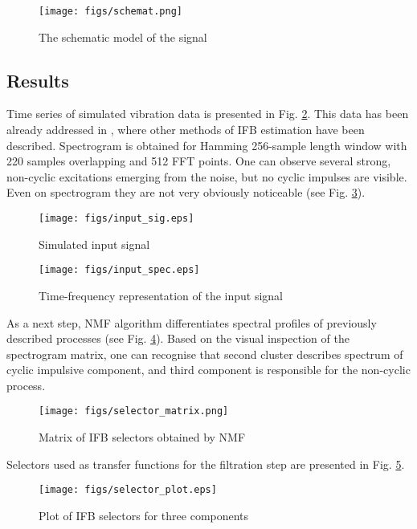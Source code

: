 \documentclass[conference,a4paper]{IEEEtran}
\begin{document}
\begin{figure}[ht!]
    \centering
    \texttt{[image: figs/schemat.png]}
    \caption{The schematic model of the signal}
    \label{fig:schemat sygnal}
\end{figure}

\subsection{Results}

Time series of simulated vibration data is presented in Fig. \ref{fig: input}. This data has been already addressed in \cite{wylomanskaimpulsive}, where other methods of IFB estimation have been described. Spectrogram is obtained for Hamming 256-sample length window with 220 samples overlapping and 512 FFT points. One can observe several strong, non-cyclic excitations emerging from the noise, but no cyclic impulses are visible. Even on spectrogram they are not very obviously noticeable (see Fig. \ref{fig: spectrogram}).

\begin{figure}[!ht]
\centering
\texttt{[image: figs/input\_sig.eps]}
\caption{Simulated input signal}
\label{fig: input}
\end{figure}

\begin{figure}[!ht]
\centering
\texttt{[image: figs/input\_spec.eps]}
\caption{Time-frequency representation of the input signal}
\label{fig: spectrogram}
\end{figure}

As a next step, NMF algorithm differentiates spectral profiles of previously described processes (see Fig. \ref{fig: selmat}). Based on the visual inspection of the spectrogram matrix, one can recognise that second cluster describes spectrum of cyclic impulsive component, and third component is responsible for the non-cyclic process.

\begin{figure}[!ht]
\centering
\texttt{[image: figs/selector\_matrix.png]}
\caption{Matrix of IFB selectors obtained by NMF}
\label{fig: selmat}
\end{figure}

Selectors used as transfer functions for the filtration step are presented in Fig. \ref{fig: selplots}. 

\begin{figure}[!ht]
\centering
\texttt{[image: figs/selector\_plot.eps]}
\caption{Plot of IFB selectors for three components}
\label{fig: selplots}
\end{figure}
\end{document}
